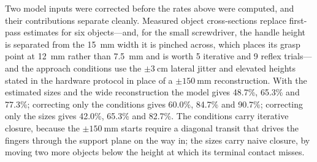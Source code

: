 Two model inputs were corrected before the rates above were computed, and their
contributions separate cleanly. Measured object cross-sections replace first-pass
estimates for six objects---and, for the small screwdriver, the handle height is
separated from the \SI{15}{\milli\metre} width it is pinched across, which places
its grasp point at \SI{12}{\milli\metre} rather than \SI{7.5}{\milli\metre} and
is worth 5 iterative and 9 reflex trials---and the approach conditions use the
$\pm\SI{3}{\centi\metre}$ lateral jitter and elevated heights stated in the
hardware protocol in place of a $\pm\SI{150}{\milli\metre}$ reconstruction. With
the estimated sizes and the wide reconstruction the model gives 48.7\%, 65.3\%
and 77.3\%; correcting only the conditions gives 60.0\%, 84.7\% and 90.7\%;
correcting only the sizes gives 42.0\%, 65.3\% and 82.7\%. The conditions carry
iterative closure, because the $\pm\SI{150}{\milli\metre}$ starts require a
diagonal transit that drives the fingers through the support plane on the way in;
the sizes carry naive closure, by moving two more objects below the height at
which its terminal contact misses.
